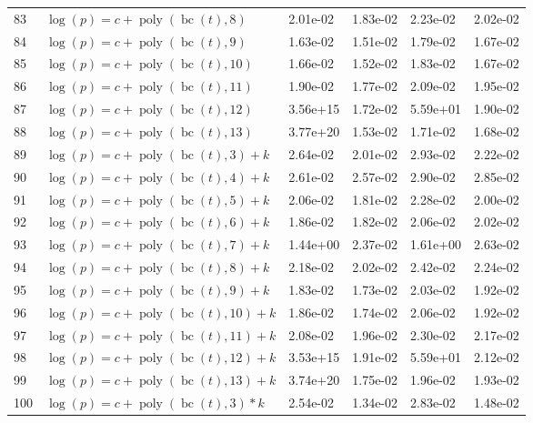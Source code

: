\documentclass[12pt,a4paper]{article}
\DeclareMathOperator{\bc}{bc}
\DeclareMathOperator{\poly}{poly}
\begin{document}
\begin{longtable}[t]{ll>{\raggedleft\arraybackslash}p{2cm}>{\raggedleft\arraybackslash}p{2cm}>{\raggedleft\arraybackslash}p{2cm}>{\raggedleft\arraybackslash}p{2cm}}
\rowcolor{gray!6}  83 & $\log(p) = c + \poly\left( \bc(t), 8 \right)$ & 2.01e-02 & 1.83e-02 & 2.23e-02 & 2.02e-02\\
84 & $\log(p) = c + \poly\left( \bc(t), 9 \right)$ & 1.63e-02 & 1.51e-02 & 1.79e-02 & 1.67e-02\\
\rowcolor{gray!6}  85 & $\log(p) = c + \poly\left( \bc(t), 10 \right)$ & 1.66e-02 & 1.52e-02 & 1.83e-02 & 1.67e-02\\
86 & $\log(p) = c + \poly\left( \bc(t), 11 \right)$ & 1.90e-02 & 1.77e-02 & 2.09e-02 & 1.95e-02\\
\rowcolor{gray!6}  87 & $\log(p) = c + \poly\left( \bc(t), 12 \right)$ & 3.56e+15 & 1.72e-02 & 5.59e+01 & 1.90e-02\\
88 & $\log(p) = c + \poly\left( \bc(t), 13 \right)$ & 3.77e+20 & 1.53e-02 & 1.71e-02 & 1.68e-02\\
\rowcolor{gray!6}  89 & $\log(p) = c + \poly\left( \bc(t), 3 \right) + k$ & 2.64e-02 & 2.01e-02 & 2.93e-02 & 2.22e-02\\
90 & $\log(p) = c + \poly\left( \bc(t), 4 \right) + k$ & 2.61e-02 & 2.57e-02 & 2.90e-02 & 2.85e-02\\
\rowcolor{gray!6}  91 & $\log(p) = c + \poly\left( \bc(t), 5 \right) + k$ & 2.06e-02 & 1.81e-02 & 2.28e-02 & 2.00e-02\\
92 & $\log(p) = c + \poly\left( \bc(t), 6 \right) + k$ & 1.86e-02 & 1.82e-02 & 2.06e-02 & 2.02e-02\\
\rowcolor{gray!6}  93 & $\log(p) = c + \poly\left( \bc(t), 7 \right) + k$ & 1.44e+00 & 2.37e-02 & 1.61e+00 & 2.63e-02\\
94 & $\log(p) = c + \poly\left( \bc(t), 8 \right) + k$ & 2.18e-02 & 2.02e-02 & 2.42e-02 & 2.24e-02\\
\rowcolor{gray!6}  95 & $\log(p) = c + \poly\left( \bc(t), 9 \right) + k$ & 1.83e-02 & 1.73e-02 & 2.03e-02 & 1.92e-02\\
96 & $\log(p) = c + \poly\left( \bc(t), 10 \right) + k$ & 1.86e-02 & 1.74e-02 & 2.06e-02 & 1.92e-02\\
\rowcolor{gray!6}  97 & $\log(p) = c + \poly\left( \bc(t), 11 \right) + k$ & 2.08e-02 & 1.96e-02 & 2.30e-02 & 2.17e-02\\
98 & $\log(p) = c + \poly\left( \bc(t), 12 \right) + k$ & 3.53e+15 & 1.91e-02 & 5.59e+01 & 2.12e-02\\
\rowcolor{gray!6}  99 & $\log(p) = c + \poly\left( \bc(t), 13 \right) + k$ & 3.74e+20 & 1.75e-02 & 1.96e-02 & 1.93e-02\\
100 & $\log(p) = c + \poly\left( \bc(t), 3 \right) * k$ & 2.54e-02 & 1.34e-02 & 2.83e-02 & 1.48e-02\\

\end{longtable}
\end{document}
